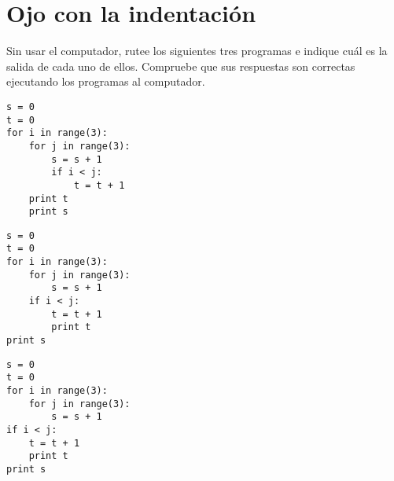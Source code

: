 \section{Ojo con la indentación}

Sin usar el computador, rutee los siguientes tres programas e indique
cuál es la salida de cada uno de ellos.
Compruebe que sus respuestas son correctas
ejecutando los programas al computador.

\begin{lstlisting}
s = 0
t = 0
for i in range(3):
    for j in range(3):
        s = s + 1
        if i < j:
            t = t + 1
    print t
    print s
\end{lstlisting}

\begin{lstlisting}
s = 0
t = 0
for i in range(3):
    for j in range(3):
        s = s + 1
    if i < j:
        t = t + 1
        print t
print s
\end{lstlisting}

\begin{lstlisting}
s = 0
t = 0
for i in range(3):
    for j in range(3):
        s = s + 1
if i < j:
    t = t + 1
    print t
print s
\end{lstlisting}

